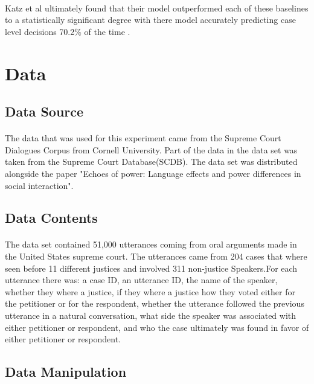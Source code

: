 \documentclass[12pt,english]{article}
\begin{document}
\paragraph{}
Katz et al ultimately found that their model outperformed each of these baselines to a statistically significant degree with there model accurately predicting case level decisions 70.2\% of the time . 
\section{Data}
\subsection{Data Source}
\paragraph{}
The data that was used for this experiment came from the Supreme Court Dialogues Corpus from Cornell University\citep{noauthor_supreme_nodate}. Part of the data in the data set was taken from the Supreme Court Database(SCDB). The data set was distributed alongside the paper "Echoes of power: Language effects and power differences in social interaction"\citep{danescu-niculescu-mizil_echoes_2012}.
\subsection{Data Contents}
\paragraph{}
The data set contained 51,000 utterances coming from oral arguments made in the United States supreme court. The utterances came from 204 cases that where seen before 11 different justices and involved 311 non-justice Speakers.For each utterance there was: a case ID, an utterance ID, the name of the speaker, whether they where a justice, if they where a justice how they voted either for the petitioner or for the respondent, whether the utterance followed the previous utterance in a natural conversation, what side the speaker was associated with either petitioner or  respondent, and who the case ultimately was found in favor of either petitioner or respondent.
\subsection{Data Manipulation}
\end{document}
